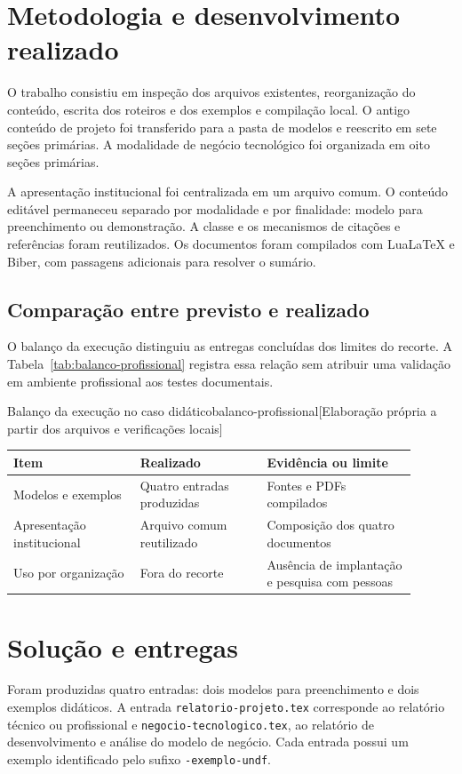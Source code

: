 \chapter{Metodologia e desenvolvimento realizado}
O trabalho consistiu em inspeção dos arquivos existentes, reorganização do
conteúdo, escrita dos roteiros e dos exemplos e compilação local. O antigo
conteúdo de projeto foi transferido para a pasta de modelos e reescrito em
sete seções primárias. A modalidade de negócio tecnológico foi organizada
em oito seções primárias.

A apresentação institucional foi centralizada em um arquivo comum. O
conteúdo editável permaneceu separado por modalidade e por finalidade:
modelo para preenchimento ou demonstração. A classe e os mecanismos de
citações e referências foram reutilizados. Os documentos foram compilados
com LuaLaTeX e Biber, com passagens adicionais para resolver o sumário.

\section{Comparação entre previsto e realizado}
O balanço da execução distinguiu as entregas concluídas dos limites do recorte.
A Tabela~\ref{tab:balanco-profissional} registra essa relação sem atribuir
uma validação em ambiente profissional aos testes documentais.

\begin{undftabela}[H]{Balanço da execução no caso didático}{balanco-profissional}[Elaboração própria a partir dos arquivos e verificações locais]
\begin{tabular}{@{}p{0.28\linewidth}p{0.29\linewidth}p{0.33\linewidth}@{}}
\hline
\textbf{Item} & \textbf{Realizado} & \textbf{Evidência ou limite} \\
\hline
Modelos e exemplos & Quatro entradas produzidas & Fontes e PDFs compilados \\
Apresentação institucional & Arquivo comum reutilizado & Composição dos quatro documentos \\
Uso por organização & Fora do recorte & Ausência de implantação e pesquisa com pessoas \\
\hline
\end{tabular}
\end{undftabela}

\chapter{Solução e entregas}
Foram produzidas quatro entradas: dois modelos para preenchimento e dois
exemplos didáticos. A entrada \texttt{relatorio-projeto.tex} corresponde ao
relatório técnico ou profissional e \texttt{negocio-tecnologico.tex}, ao
relatório de desenvolvimento e análise do modelo de negócio. Cada entrada
possui um exemplo identificado pelo sufixo \texttt{-exemplo-undf}.

